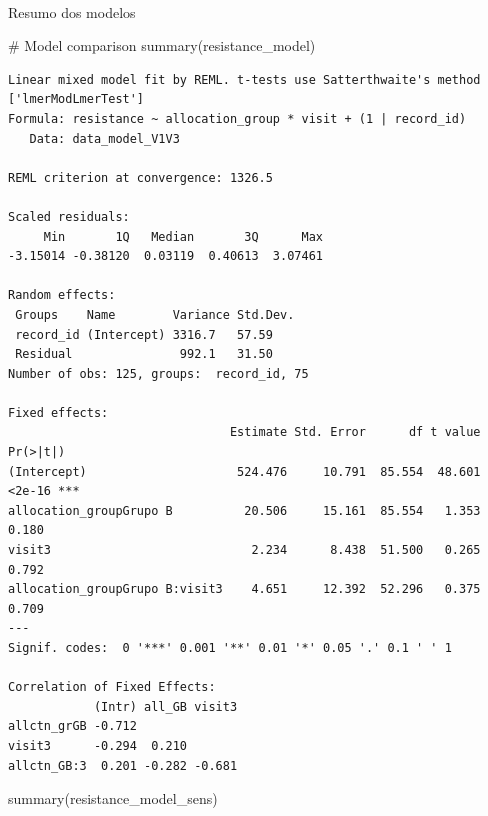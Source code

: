 \documentclass[
  12pt,
]{article}
\makeatletter
\let\oldparagraph\paragraph
\renewcommand{\paragraph}{
    \@ifstar
      \xxxParagraphStar
      \xxxParagraphNoStar
  }
\newcommand{\xxxParagraphStar}[1]{\oldparagraph*{#1}\mbox{}}
\newcommand{\xxxParagraphNoStar}[1]{\oldparagraph{#1}\mbox{}}
\newenvironment{Shaded}{\begin{snugshade}}{\end{snugshade}}
\newcommand{\CommentTok}[1]{\textcolor[rgb]{0.37,0.37,0.37}{#1}}
\newcommand{\FunctionTok}[1]{\textcolor[rgb]{0.28,0.35,0.67}{#1}}
\newcommand{\NormalTok}[1]{\textcolor[rgb]{0.00,0.23,0.31}{#1}}
\makeatother
\begin{document}
\paragraph{Resumo dos modelos}\label{resumo-dos-modelos-19}

\begin{Shaded}
\begin{Highlighting}[]
\CommentTok{\# Model comparison}
\FunctionTok{summary}\NormalTok{(resistance\_model)}
\end{Highlighting}
\end{Shaded}

\begin{verbatim}
Linear mixed model fit by REML. t-tests use Satterthwaite's method ['lmerModLmerTest']
Formula: resistance ~ allocation_group * visit + (1 | record_id)
   Data: data_model_V1V3

REML criterion at convergence: 1326.5

Scaled residuals: 
     Min       1Q   Median       3Q      Max 
-3.15014 -0.38120  0.03119  0.40613  3.07461 

Random effects:
 Groups    Name        Variance Std.Dev.
 record_id (Intercept) 3316.7   57.59   
 Residual               992.1   31.50   
Number of obs: 125, groups:  record_id, 75

Fixed effects:
                               Estimate Std. Error      df t value Pr(>|t|)    
(Intercept)                     524.476     10.791  85.554  48.601   <2e-16 ***
allocation_groupGrupo B          20.506     15.161  85.554   1.353    0.180    
visit3                            2.234      8.438  51.500   0.265    0.792    
allocation_groupGrupo B:visit3    4.651     12.392  52.296   0.375    0.709    
---
Signif. codes:  0 '***' 0.001 '**' 0.01 '*' 0.05 '.' 0.1 ' ' 1

Correlation of Fixed Effects:
            (Intr) all_GB visit3
allctn_grGB -0.712              
visit3      -0.294  0.210       
allctn_GB:3  0.201 -0.282 -0.681
\end{verbatim}

\begin{Shaded}
\begin{Highlighting}[]
\FunctionTok{summary}\NormalTok{(resistance\_model\_sens)}
\end{Highlighting}
\end{Shaded}
\end{document}
